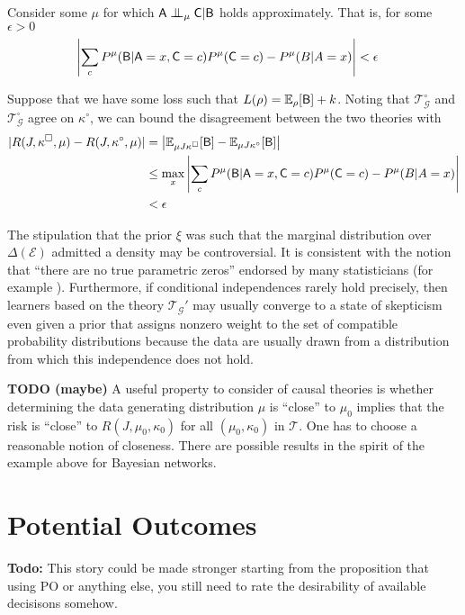 Consider some $\mu$ for which $\RV{A} \CI_\mu \RV{C} | \RV{B}$ holds approximately. That is, for some $\epsilon>0$
\begin{align}
    \left|\sum_c P^\mu(\mathsf{B}|\mathsf{A}=x,\mathsf{C}=c)P^\mu(\mathsf{C}=c)-P^\mu(B|A=x)\right| &< \epsilon \label{eq:app_ci}
\end{align}

Suppose that we have some loss such that $L(\rho)= \mathbb{E}_\rho[\mathsf{B}] + k$. Noting that $\mathscr{T}^\circ_\mathcal{G}$ and $\mathscr{T}^\square_\mathcal{G}$ agree on $\kappa^\circ$, we can bound the disagreement between the two theories with
\begin{align}
    |R(J,\kappa^\square,\mu) - R(J,\kappa^\circ,\mu)| &=  \left|\mathbb{E}_{\mu J \kappa^\square} [\mathsf{B}] - \mathbb{E}_{\mu J \kappa^\circ} [\mathsf{B}]\right|\\
        &\leq \max_x \left|\sum_c P^\mu(\mathsf{B}|\mathsf{A}=x,\mathsf{C}=c)P^\mu(\mathsf{C}=c)-P^\mu(B|A=x) \right|\\
        &< \epsilon
\end{align}

The stipulation that the prior $\xi$ was such that the marginal distribution over $\Delta(\mathcal{E})$ admitted a density may be controversial. It is consistent with the notion that ``there are no true parametric zeros'' endorsed by many statisticians (for example  \cite{gelman_bayesian_2010,meehl_theory-testing_1967,berkson_difficulties_1938}). Furthermore, if conditional independences rarely hold precisely, then learners based on the theory $\mathscr{T}_{\mathcal{G}}'$ may usually converge to a state of skepticism even given a prior that assigns nonzero weight to the set of compatible probability distributions because the data are usually drawn from a distribution from which this independence does not hold.

\textbf{TODO (maybe)} A useful property to consider of causal theories is whether determining the data generating distribution $\mu$ is ``close'' to $\mu_0$ implies that the risk is ``close'' to $R(J,\mu_0,\kappa_0)$ for all $(\mu_0,\kappa_0)$ in $\mathscr{T}$. One has to choose a reasonable notion of closeness. There are possible results in the spirit of the example above for Bayesian networks.

\section{Potential Outcomes}

\textbf{Todo: } This story could be made stronger starting from the proposition that using PO or anything else, you still need to rate the desirability of available decisisons somehow.

